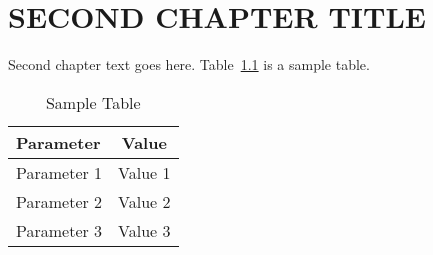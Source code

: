  \chapter{SECOND CHAPTER TITLE}\label{chap:chap2}
 Second chapter text goes here.  Table~\ref{tbl:chap2:table1} is a sample table.
\begin{table} [h!]
\caption{Sample Table} \label{tbl:chap2:table1}
\begin{center}
\begin{tabular}{|l|c|}
    \hline
    Parameter & Value \\
    \hline
    Parameter 1 & Value 1\\
    Parameter 2 & Value 2\\
    Parameter 3 & Value 3\\
    \hline
\end{tabular}
\end{center}
\end{table}